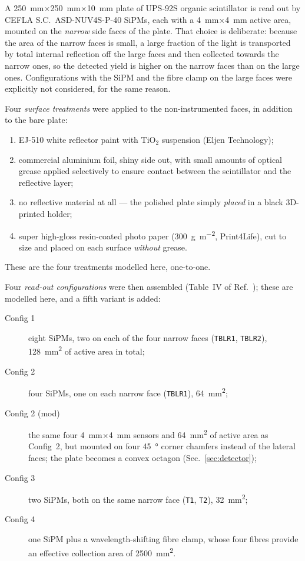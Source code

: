\documentclass[11pt,a4paper]{article}
\begin{document}
A \SI{250}{\milli\meter}$\times$\SI{250}{\milli\meter}$\times$\SI{10}{\milli\meter}
plate of UPS-92S organic scintillator is read out by
CEFLA S.C.\ ASD-NUV4S-P-40 SiPMs, each with a \SI{4}{\milli\meter}$\times$\SI{4}{\milli\meter}
active area, mounted on the \emph{narrow} side faces of the plate. That
choice is deliberate: because the area of the narrow faces is small, a large
fraction of the light is transported by total internal reflection off the
large faces and then collected towards the narrow ones, so the detected yield
is higher on the narrow faces than on the large ones. Configurations with
the SiPM and the fibre clamp on the large faces were explicitly not
considered, for the same reason.

Four \emph{surface treatments} were applied to the non-instrumented faces,
in addition to the bare plate:
\begin{enumerate}
  \item EJ-510 white reflector paint with TiO$_2$ suspension (Eljen
        Technology);
  \item commercial aluminium foil, shiny side out, with small amounts of
        optical grease applied selectively to ensure contact between the
        scintillator and the reflective layer;
  \item no reflective material at all --- the polished plate simply
        \emph{placed} in a black 3D-printed holder;
  \item super high-gloss resin-coated photo paper (\SI{300}{\gram\per\square\meter},
        Print4Life), cut to size and placed on each surface \emph{without}
        grease.
\end{enumerate}
These are the four treatments modelled here, one-to-one.

Four \emph{read-out configurations} were then assembled (Table~IV of
Ref.~\cite{Rao2025}); these are modelled here, and a fifth variant is added:
\begin{description}
  \item[Config 1] eight SiPMs, two on each of the four narrow faces
        (\texttt{TBLR1}, \texttt{TBLR2}), \SI{128}{\milli\meter\squared} of
        active area in total;
  \item[Config 2] four SiPMs, one on each narrow face (\texttt{TBLR1}),
        \SI{64}{\milli\meter\squared};
  \item[Config 2 (mod)] the same four \SI{4}{\milli\meter}$\times$\SI{4}{\milli\meter}
        sensors and \SI{64}{\milli\meter\squared} of active area as Config~2,
        but mounted on four \SI{45}{\degree} corner chamfers instead of the
        lateral faces; the plate becomes a convex octagon (Sec.~\ref{sec:detector});
  \item[Config 3] two SiPMs, both on the same narrow face (\texttt{T1},
        \texttt{T2}), \SI{32}{\milli\meter\squared};
  \item[Config 4] one SiPM plus a wavelength-shifting fibre clamp, whose
        four fibres provide an effective collection area of
        \SI{2500}{\milli\meter\squared}.
\end{description}
\end{document}
